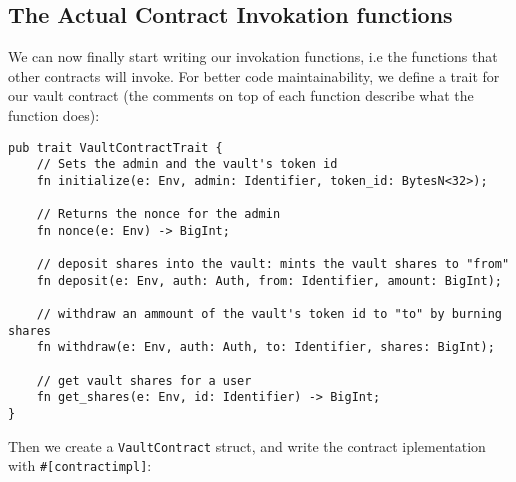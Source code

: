 \documentclass{article}
\newcommand{\inl}[1]{\lstinline{#1}}
\begin{document}
\subsection{The Actual Contract Invokation functions}
We can now finally start writing our invokation functions, i.e the functions that other contracts will invoke. For better code maintainability, we define a trait for our vault contract (the comments on top of each function describe what the function does):

\begin{lstlisting}
pub trait VaultContractTrait {
    // Sets the admin and the vault's token id
    fn initialize(e: Env, admin: Identifier, token_id: BytesN<32>);

    // Returns the nonce for the admin
    fn nonce(e: Env) -> BigInt;

    // deposit shares into the vault: mints the vault shares to "from"
    fn deposit(e: Env, auth: Auth, from: Identifier, amount: BigInt);

    // withdraw an ammount of the vault's token id to "to" by burning shares
    fn withdraw(e: Env, auth: Auth, to: Identifier, shares: BigInt);

    // get vault shares for a user
    fn get_shares(e: Env, id: Identifier) -> BigInt;
}
\end{lstlisting}

Then we create a \inl{VaultContract} struct, and write the contract iplementation with \inl{#[contractimpl]}:
\end{document}
